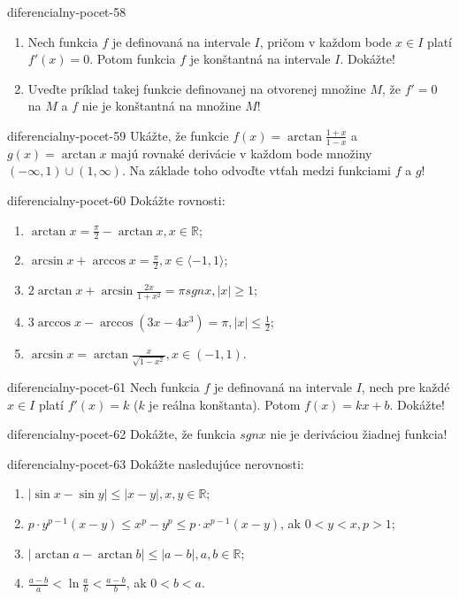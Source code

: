 \begin{defproblem}{diferencialny-pocet-58}
\begin{enumerate}
\item Nech funkcia $f$ je definovaná na intervale $I$, pričom v každom bode $x\in I$ platí $f'(x)=0$. Potom funkcia $f$ je konštantná na intervale $I$. Dokážte!
\item Uveďte príklad takej funkcie definovanej na otvorenej množine $M$, že $f'=0$ na $M$ a $f$ nie je konštantná na množine $M$!
\end{enumerate}
\end{defproblem}

\begin{defproblem}{diferencialny-pocet-59}
Ukážte, že funkcie $f(x)=\arctan \frac{1+x}{1-x}$ a $g(x)=\arctan x$ majú rovnaké derivácie v každom bode množiny $(-\infty,1)\cup (1,\infty)$. Na základe toho odvoďte vtťah medzi funkciami $f$ a $g$!
\end{defproblem}

\begin{defproblem}{diferencialny-pocet-60}
Dokážte rovnosti:
\begin{enumerate}
\item $\arctan x=\frac{\pi}{2}-\arctan x,x\in\mathbb{R}$;
\item $\arcsin x+\arccos x=\frac{\pi}{2},x\in\langle -1,1 \rangle$;
\item $2\arctan x+\arcsin \frac{2x}{1+x^2}=\pi sgn x,|x|\geq 1$;
\item $3\arccos x-\arccos (3x-4x^3)=\pi ,|x|\leq \frac{1}{2}$;
\item $\arcsin x=\arctan \frac{x}{\sqrt{1-x^2}},x\in (-1,1)$.
\end{enumerate}
\end{defproblem}

\begin{defproblem}{diferencialny-pocet-61}
Nech funkcia $f$ je definovaná na intervale $I$, nech pre každé $x\in I$ platí $f'(x)=k$ ($k$ je reálna konštanta). Potom $f(x)=kx+b$. Dokážte!
\end{defproblem}

\begin{defproblem}{diferencialny-pocet-62}
Dokážte, že funkcia $sgn x$ nie je deriváciou žiadnej funkcia!
\end{defproblem}

\begin{defproblem}{diferencialny-pocet-63}
Dokážte nasledujúce nerovnosti:
\begin{enumerate}
\item $|\sin x-\sin y|\leq |x-y|,x,y\in\mathbb{R}$;
\item $p\cdot y^{p-1}(x-y)\leq x^p-y^p \leq p\cdot x^{p-1}(x-y)$, ak $0<y<x,p>1$;
\item $|\arctan a-\arctan b|\leq |a-b|,a,b\in\mathbb{R}$;
\item $\frac{a-b}{a}<\ln \frac{a}{b}<\frac{a-b}{b}$, ak $0<b<a$.
\end{enumerate}
\end{defproblem}

